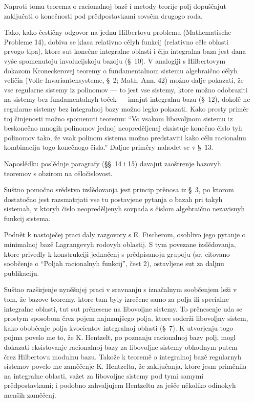 \documentclass[11pt]{article}
\begin{document}
Naproti tomu teorema o racionalnoj bazě i metody teorije polj dopuščajut zaključati o konečnosti pod prědpostavkami sovsěm drugogo roda.

Tako, kako čestičny odgovor na jednu Hilbertovu problemu (Mathematische Probleme 14), dobiva se klasa relativno cělyh funkcij (relativno cěle oblasti prvogo tipa), ktore sut konečne integralne oblasti i čija integralna baza jest dana vyše spomenutoju involucijskoju bazoju (\S\ 10). V analogiji s Hilbertovym dokazom Kroneckerovej teoremy o fundamentalnom sistemu algebraično cělyh veličin (Volle Invariantensysteme, \S\ 2; Math. Ann. 42) možno dalje pokazati, že vse regularne sistemy iz polinomov --- to jest vse sistemy, ktore možno odobraziti na sistemy bez fundamentalnyh toček --- imajut integralnu bazu (\S\ 12), dokolě ne regularne sistemy bez integralnoj bazy možno legko pokazati. Kako prosty priměr toj činjenosti možno spomenuti teoremu: ``Vo vsakom libovoljnom sistemu iz beskonečno mnogih polinomov jednoj neopreděljenej eksistuje konečno čislo tyh polinomov tako, že vsak polinom sistema možno predstaviti kako cělu racionalnu kombinaciju togo konečnogo čisla.'' Daljne priměry nahodet se v \S\ 13.

Naposlědku poslědnje paragrafy (\S\S\ 14 i 15) davajut zaoštrenje bazovyh teoremov s obzirom na cěločislovost.

Suštno pomočno srědstvo izslědovanja jest princip prěnosa iz \S\ 3, po ktorom dostatočno jest razsmatrjati vse tu postavjene pytanja o bazah pri takyh sistemah, v ktoryh čislo neopreděljenyh sovpada s čislom algebraično nezavisnyh funkcij sistema.

Podnět k nastoječej praci daly razgovory s E. Fischerom, osoblivo jego pytanje o minimalnoj bazě Lagrangevyh rodovyh oblastij. S tym povezane izslědovanja, ktore privedly k konstrukciji jednačenj s prědpisanoju grupoju (sr. citovano soobčenje o ``Poljah racionalnyh funkcij'', čest 2), ostavljene sut za daljnu publikaciju.

Suštno razširjenje nyněšnjej praci v sravnanju s iznačalnym soobčenjem leži v tom, že bazove teoremy, ktore tam byly izrečene samo za polja ili specialne integralne oblasti, tut sut prěnesene na libovoljne sistemy. To prěnesenje uda se prostym sposobom črez pojem najmanjšego polja, ktore soderži libovoljny sistem, kako obobčenje polja kvocientov integralnoj oblasti (\S\ 7). K utvorjenju togo pojma povelo me to, že K. Hentzelt, po poznanju racionalnoj bazy polj, mogl dokazati eksistovanje racionalnoj bazy za libovoljne sistemy obhodnym putem črez Hilbertovu modulnu bazu. Takože k teoremě o integralnoj bazě regularnyh sistemov povelo me zaměčenje K. Hentzelta, že zaključanja, ktore jesm priměnila na integralne oblasti, važet za libovoljne sistemy pod tymi samymi prědpostavkami; i podobno zahvaljujem Hentzeltu za ješče několiko odinokyh menših zaměčenj.
\end{document}
